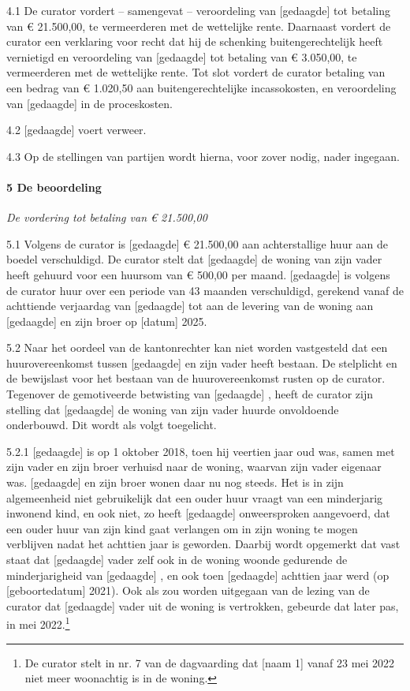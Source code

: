 \documentclass[
  dutch,
  a4paper,
]{article}
\begin{document}
4.1 De curator vordert -- samengevat -- veroordeling van {[}gedaagde{]} tot betaling van € 21.500,00, te vermeerderen met de wettelijke rente. Daarnaast vordert de curator een verklaring voor recht dat hij de schenking buitengerechtelijk heeft vernietigd en veroordeling van {[}gedaagde{]} tot betaling van € 3.050,00, te vermeerderen met de wettelijke rente. Tot slot vordert de curator betaling van een bedrag van € 1.020,50 aan buitengerechtelijke incassokosten, en veroordeling van {[}gedaagde{]} in de proceskosten.

4.2 {[}gedaagde{]} voert verweer.

4.3 Op de stellingen van partijen wordt hierna, voor zover nodig, nader ingegaan.

\paragraph{5 De beoordeling}\label{de-beoordeling}

\emph{De vordering tot betaling van € 21.500,00}

5.1 Volgens de curator is {[}gedaagde{]} € 21.500,00 aan achterstallige huur aan de boedel verschuldigd. De curator stelt dat {[}gedaagde{]} de woning van zijn vader heeft gehuurd voor een huursom van € 500,00 per maand. {[}gedaagde{]} is volgens de curator huur over een periode van 43 maanden verschuldigd, gerekend vanaf de achttiende verjaardag van {[}gedaagde{]} tot aan de levering van de woning aan {[}gedaagde{]} en zijn broer op {[}datum{]} 2025.

5.2 Naar het oordeel van de kantonrechter kan niet worden vastgesteld dat een huurovereenkomst tussen {[}gedaagde{]} en zijn vader heeft bestaan. De stelplicht en de bewijslast voor het bestaan van de huurovereenkomst rusten op de curator. Tegenover de gemotiveerde betwisting van {[}gedaagde{]} , heeft de curator zijn stelling dat {[}gedaagde{]} de woning van zijn vader huurde onvoldoende onderbouwd. Dit wordt als volgt toegelicht.

5.2.1 {[}gedaagde{]} is op 1 oktober 2018, toen hij veertien jaar oud was, samen met zijn vader en zijn broer verhuisd naar de woning, waarvan zijn vader eigenaar was. {[}gedaagde{]} en zijn broer wonen daar nu nog steeds. Het is in zijn algemeenheid niet gebruikelijk dat een ouder huur vraagt van een minderjarig inwonend kind, en ook niet, zo heeft {[}gedaagde{]} onweersproken aangevoerd, dat een ouder huur van zijn kind gaat verlangen om in zijn woning te mogen verblijven nadat het achttien jaar is geworden. Daarbij wordt opgemerkt dat vast staat dat {[}gedaagde{]} vader zelf ook in de woning woonde gedurende de minderjarigheid van {[}gedaagde{]} , en ook toen {[}gedaagde{]} achttien jaar werd (op {[}geboortedatum{]} 2021). Ook als zou worden uitgegaan van de lezing van de curator dat {[}gedaagde{]} vader uit de woning is vertrokken, gebeurde dat later pas, in mei 2022.\footnote{De curator stelt in nr. 7 van de dagvaarding dat {[}naam 1{]} vanaf 23 mei 2022 niet meer woonachtig is in de woning.}
\end{document}
